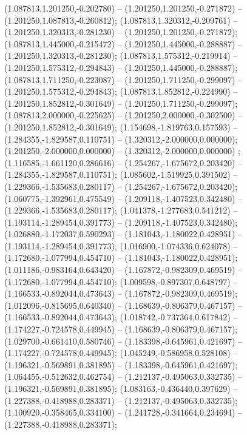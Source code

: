  (1.087813,1.201250,-0.202780) -- (1.201250,1.201250,-0.271872) -- (1.201250,1.087813,-0.260812);
 (1.087813,1.320312,-0.209761) -- (1.201250,1.320313,-0.281230) -- (1.201250,1.201250,-0.271872);
 (1.087813,1.445000,-0.215472) -- (1.201250,1.445000,-0.288887) -- (1.201250,1.320313,-0.281230);
 (1.087813,1.575312,-0.219914) -- (1.201250,1.575312,-0.294843) -- (1.201250,1.445000,-0.288887);
 (1.087813,1.711250,-0.223087) -- (1.201250,1.711250,-0.299097) -- (1.201250,1.575312,-0.294843);
 (1.087813,1.852812,-0.224990) -- (1.201250,1.852812,-0.301649) -- (1.201250,1.711250,-0.299097);
 (1.087813,2.000000,-0.225625) -- (1.201250,2.000000,-0.302500) -- (1.201250,1.852812,-0.301649);
 (1.154698,-1.819763,0.157593) -- (1.284355,-1.829587,0.110751) -- (1.320312,-2.000000,0.000000);
 (1.201250,-2.000000,0.000000) -- (1.320312,-2.000000,0.000000) ;
 (1.116585,-1.661120,0.286616) -- (1.254267,-1.675672,0.203420) -- (1.284355,-1.829587,0.110751);
 (1.085602,-1.519925,0.391502) -- (1.229366,-1.535683,0.280117) -- (1.254267,-1.675672,0.203420);
 (1.060775,-1.392961,0.475549) -- (1.209118,-1.407523,0.342480) -- (1.229366,-1.535683,0.280117);
 (1.041378,-1.277683,0.541212) -- (1.193114,-1.289454,0.391773) -- (1.209118,-1.407523,0.342480);
 (1.026880,-1.172037,0.590293) -- (1.181043,-1.180022,0.428951) -- (1.193114,-1.289454,0.391773);
 (1.016900,-1.074336,0.624078) -- (1.172680,-1.077994,0.454710) -- (1.181043,-1.180022,0.428951);
 (1.011186,-0.983164,0.643420) -- (1.167872,-0.982309,0.469519) -- (1.172680,-1.077994,0.454710);
 (1.009598,-0.897307,0.648797) -- (1.166533,-0.892044,0.473643) -- (1.167872,-0.982309,0.469519);
 (1.012096,-0.815695,0.640340) -- (1.168639,-0.806379,0.467157) -- (1.166533,-0.892044,0.473643);
 (1.018742,-0.737364,0.617842) -- (1.174227,-0.724578,0.449945) -- (1.168639,-0.806379,0.467157);
 (1.029700,-0.661410,0.580746) -- (1.183398,-0.645961,0.421697) -- (1.174227,-0.724578,0.449945);
 (1.045249,-0.586958,0.528108) -- (1.196321,-0.569891,0.381895) -- (1.183398,-0.645961,0.421697);
 (1.064455,-0.512632,0.462754) -- (1.212137,-0.495063,0.332735) -- (1.196321,-0.569891,0.381895);
 (1.083163,-0.436440,0.397629) -- (1.227388,-0.418988,0.283371) -- (1.212137,-0.495063,0.332735);
 (1.100920,-0.358465,0.334100) -- (1.241728,-0.341664,0.234694) -- (1.227388,-0.418988,0.283371);
